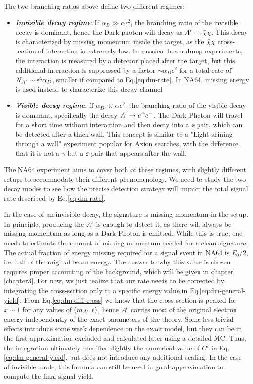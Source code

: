 The two branching ratios above define two different regimes:
\begin{itemize}
\item \textbf{\textit{Invisible decay regime}}: If $\alpha_D \gg \alpha \epsilon^2$, the branching ratio of the invisible decay is dominant, hence the Dark photon will decay as $A' \to \bar{\chi} \chi$. This decay is characterized by missing momentum inside the target, as the $\bar{\chi} \chi$ cross-section of interaction is extremely low. In classical beam-dump experiments, the interaction is measured by a detector placed after the target, but this additional interaction is suppressed by a factor $\sim \alpha_D \epsilon^2$ for a total rate of $N_{A'} \sim \epsilon^4 \alpha_D$, smaller if compared to Eq.\ref{eq:dm-rate}. In NA64, missing energy is used instead to characterize this decay channel.
\item \textbf{\textit{Visible decay regime}}: If $\alpha_D \ll \alpha \epsilon^2$, the branching ratio of the visible decay is dominant, specifically the decay $A' \to e^+e^-$. The Dark Photon will travel for a short time without interaction and then decay into a $\ee$ pair, which can be detected after a thick wall. This concept is similar to a "Light shining through a wall" experiment popular for Axion searches, with the difference that it is not a $\gamma$ but a $\ee$ pair that appears after the wall.
\end{itemize}

The NA64 experiment aims to cover both of these regimes, with slightly different setups to accommodate their different phenomenology. We need to study the two decay modes to see how the precise detection strategy will impact the total signal rate described by Eq.\ref{eq:dm-rate}.

In the case of an invisible decay, the signature is missing momentum in the setup. In principle, producing the $A'$ is enough to detect it, as there will always be missing momentum as long as a Dark Photon is emitted. While this is true, one needs to estimate the amount of missing momentum needed for a clean signature. The actual fraction of energy missing required for a signal event in NA64 is $E_0/2$, i.e. half of the original beam energy. The answer to why this value is chosen requires proper accounting of the background, which will be given in chapter \ref{chapter3}.  For now, we just realize that our rate needs to be corrected by integrating the cross-section only to a specific energy value in Eq.\ref{eq:dm-general-yield}. From Eq.\ref{eq:dm-diff-cross} we know that the cross-section is peaked for $x \sim 1$ for any values of $(m_{A'};\epsilon)$, hence $A'$ carries most of the original electron energy independently of the exact parameters of the theory. Some less trivial effects introduce some weak dependence on the exact model, but they can be in the first approximation excluded and calculated later using a detailed MC. Thus, the integration ultimately modifies slightly the numerical value of $C'$ in Eq.\ref{eq:dm-general-yield}, but does not introduce any additional scaling. In the case of invisible mode, this formula can still be used in good approximation to compute the final signal yield.

